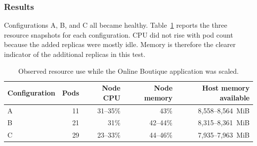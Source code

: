 \subsubsection{Results}

Configurations A, B, and C all became healthy. Table~\ref{tab:h9-topology-scaling-results} reports the three resource snapshots for each configuration. CPU did not rise with pod count because the added replicas were mostly idle. Memory is therefore the clearer indicator of the additional replicas in this test.

\begin{table}[H]
    \centering
    \small
    \caption{Observed resource use while the Online Boutique application was scaled.}
    \label{tab:h9-topology-scaling-results}
    \begin{tabular}{@{}lrrrr@{}}
        \toprule
        Configuration & Pods & Node CPU & Node memory & Host memory available \\
        \midrule
        A & 11 & 31--35\% & 43\% & 8,558--8,564~MiB \\
        B & 21 & 31\% & 42--44\% & 8,315--8,361~MiB \\
        C & 29 & 23--33\% & 44--46\% & 7,935--7,963~MiB \\
        \bottomrule
    \end{tabular}
\end{table}




